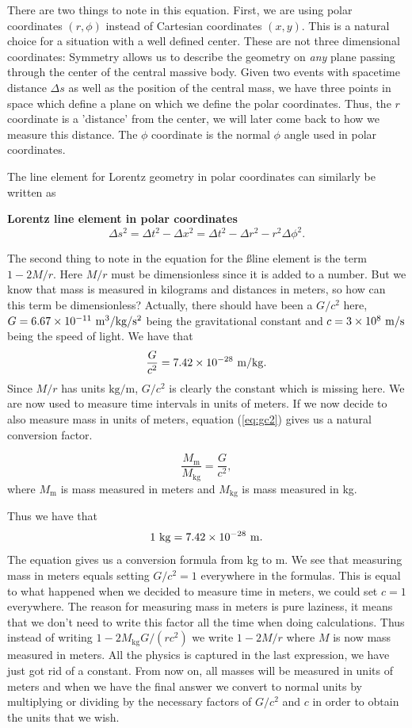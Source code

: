{\begin{multicols}{2}
There are two things to note in this equation. First, we are using polar coordinates $(r,\phi)$ instead of Cartesian coordinates $(x,y)$. This is a natural choice for a situation with a well defined center. These are not three dimensional coordinates: Symmetry allows us to describe the geometry on \emph{any} plane passing through the center of the central massive body. Given two events with spacetime distance $\Delta s$ as well as the position of the central mass, we have three points in space which define a plane on which we define the polar coordinates. Thus, the $r$ coordinate is a 'distance' from the center, we will later come back to how we measure this distance. The $\phi$ coordinate is the normal $\phi$ angle used in polar coordinates. 

The line element for Lorentz geometry in polar coordinates can similarly be written as
\begin{formbox}
\textbf{Lorentz line element in polar coordinates} 
\[
\Delta s^2=\Delta t^2-\Delta x^2=\Delta t^2-\Delta r^2-r^2\Delta\phi^2.
\]
\end{formbox}

The second thing to note in the equation for the \ss line element is the term $1-2M/r$. Here $M/r$ must be dimensionless since it is added to a number. But we know that mass is measured in kilograms and distances in meters, so how can this term be dimensionless? Actually, there should have been a $G/c^2$ here, $G=6.67\times10^{-11}{\rm\ m^3/kg/s^2}$ being the gravitational constant and $c=3\times 10^8{\rm\ m/s}$ being the speed of light. We have that
\begin{equation}
\label{eq:gc2}
\frac{G}{c^2}=7.42\times10^{-28}{\rm\ m/kg}.
\end{equation}
Since $M/r$ has units $\mathrm{kg}/\mathrm{m}$, $G/c^2$ is clearly the constant which is missing here. We are now used to measure time intervals in units of meters. If we now decide to also measure mass in units of meters, equation (\ref{eq:gc2}) gives us a natural conversion factor.
\begin{formbox}
\[
\frac{M_\mathrm{m}}{M_\mathrm{kg}}=\frac{G}{c^2},
\]
where $M_\mathrm{m}$ is mass measured in meters and $M_\mathrm{kg}$ is mass measured in kg.
\end{formbox}
Thus we have that
\[
1{\rm\ kg}=7.42\times10^{-28}{\rm\ m}.
\]
The equation gives us a conversion formula from kg to m. We see that measuring mass in meters equals setting $G/c^2=1$ everywhere in the formulas. This is equal to what happened when we decided to measure time in meters, we could set $c=1$ everywhere. The reason for measuring mass in meters is pure laziness, it means that we don't need to write this factor all the time when doing calculations. Thus instead of writing $1-2M_\mathrm{kg}G/(rc^2)$ we write $1-2M/r$ where $M$ is now mass measured in meters. All the physics is captured in the last expression, we have just got rid of a constant. From now on, all masses will be measured in units of meters and when we have the final answer we convert to normal units by multiplying or dividing by the necessary factors of $G/c^2$ and $c$ in order to obtain the units that we wish.


\end{multicols}}
